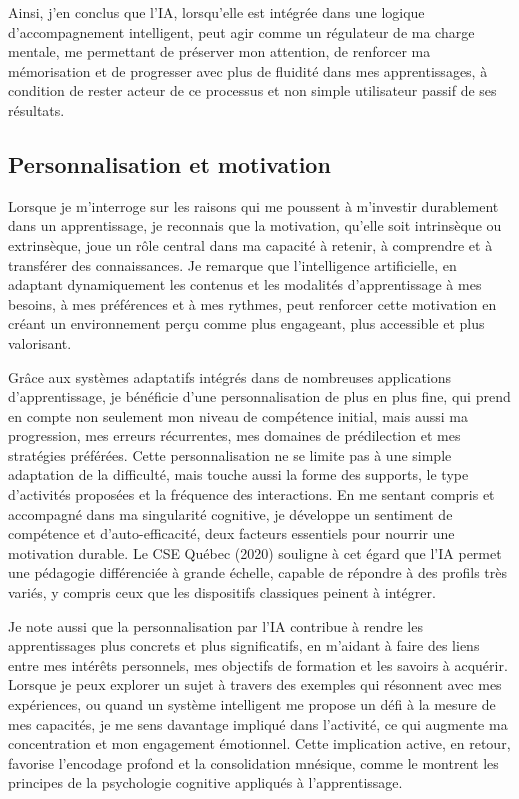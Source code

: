 \documentclass[11pt,a4paper]{report}
\begin{document}
Ainsi, j’en conclus que l’IA, lorsqu’elle est intégrée dans une logique d’accompagnement intelligent, peut agir comme un régulateur de ma charge mentale, me permettant de préserver mon attention, de renforcer ma mémorisation et de progresser avec plus de fluidité dans mes apprentissages, à condition de rester acteur de ce processus et non simple utilisateur passif de ses résultats.

\subsection{Personnalisation et motivation}

Lorsque je m’interroge sur les raisons qui me poussent à m’investir durablement dans un apprentissage, je reconnais que la motivation, qu’elle soit intrinsèque ou extrinsèque, joue un rôle central dans ma capacité à retenir, à comprendre et à transférer des connaissances. Je remarque que l’intelligence artificielle, en adaptant dynamiquement les contenus et les modalités d’apprentissage à mes besoins, à mes préférences et à mes rythmes, peut renforcer cette motivation en créant un environnement perçu comme plus engageant, plus accessible et plus valorisant.

Grâce aux systèmes adaptatifs intégrés dans de nombreuses applications d’apprentissage, je bénéficie d’une personnalisation de plus en plus fine, qui prend en compte non seulement mon niveau de compétence initial, mais aussi ma progression, mes erreurs récurrentes, mes domaines de prédilection et mes stratégies préférées. Cette personnalisation ne se limite pas à une simple adaptation de la difficulté, mais touche aussi la forme des supports, le type d’activités proposées et la fréquence des interactions. En me sentant compris et accompagné dans ma singularité cognitive, je développe un sentiment de compétence et d’auto-efficacité, deux facteurs essentiels pour nourrir une motivation durable. Le CSE Québec (2020) souligne à cet égard que l’IA permet une pédagogie différenciée à grande échelle, capable de répondre à des profils très variés, y compris ceux que les dispositifs classiques peinent à intégrer.

Je note aussi que la personnalisation par l’IA contribue à rendre les apprentissages plus concrets et plus significatifs, en m’aidant à faire des liens entre mes intérêts personnels, mes objectifs de formation et les savoirs à acquérir. Lorsque je peux explorer un sujet à travers des exemples qui résonnent avec mes expériences, ou quand un système intelligent me propose un défi à la mesure de mes capacités, je me sens davantage impliqué dans l’activité, ce qui augmente ma concentration et mon engagement émotionnel. Cette implication active, en retour, favorise l’encodage profond et la consolidation mnésique, comme le montrent les principes de la psychologie cognitive appliqués à l’apprentissage.
\end{document}
